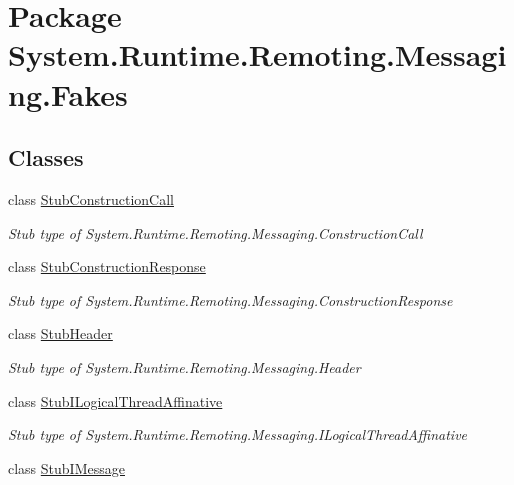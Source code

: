 \hypertarget{namespace_system_1_1_runtime_1_1_remoting_1_1_messaging_1_1_fakes}{\section{Package System.\-Runtime.\-Remoting.\-Messaging.\-Fakes}
\label{namespace_system_1_1_runtime_1_1_remoting_1_1_messaging_1_1_fakes}
}
\subsection*{Classes}
\begin{DoxyCompactItemize}
\item 
class \hyperlink{class_system_1_1_runtime_1_1_remoting_1_1_messaging_1_1_fakes_1_1_stub_construction_call}{Stub\-Construction\-Call}
\begin{DoxyCompactList}\small\item\em Stub type of System.\-Runtime.\-Remoting.\-Messaging.\-Construction\-Call\end{DoxyCompactList}\item 
class \hyperlink{class_system_1_1_runtime_1_1_remoting_1_1_messaging_1_1_fakes_1_1_stub_construction_response}{Stub\-Construction\-Response}
\begin{DoxyCompactList}\small\item\em Stub type of System.\-Runtime.\-Remoting.\-Messaging.\-Construction\-Response\end{DoxyCompactList}\item 
class \hyperlink{class_system_1_1_runtime_1_1_remoting_1_1_messaging_1_1_fakes_1_1_stub_header}{Stub\-Header}
\begin{DoxyCompactList}\small\item\em Stub type of System.\-Runtime.\-Remoting.\-Messaging.\-Header\end{DoxyCompactList}\item 
class \hyperlink{class_system_1_1_runtime_1_1_remoting_1_1_messaging_1_1_fakes_1_1_stub_i_logical_thread_affinative}{Stub\-I\-Logical\-Thread\-Affinative}
\begin{DoxyCompactList}\small\item\em Stub type of System.\-Runtime.\-Remoting.\-Messaging.\-I\-Logical\-Thread\-Affinative\end{DoxyCompactList}\item 
class \hyperlink{class_system_1_1_runtime_1_1_remoting_1_1_messaging_1_1_fakes_1_1_stub_i_message}{Stub\-I\-Message}

\end{DoxyCompactItemize}
